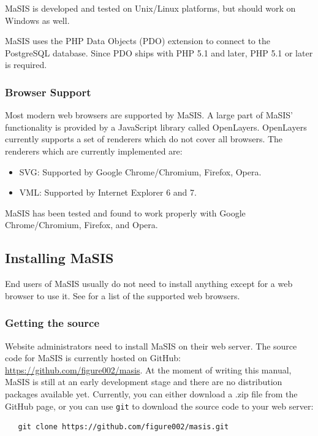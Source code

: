 \documentclass[twoside,a4paper]{refart}
\begin{document}
MaSIS is developed and tested on Unix/Linux platforms, but should work on Windows as well.

MaSIS uses the PHP Data Objects (PDO) extension to connect to the PostgreSQL database. Since PDO ships with PHP 5.1 and later, PHP 5.1 or later is required.

\subsubsection{Browser Support}
\label{Browser Support}

Most modern web browsers are supported by MaSIS. A large part of MaSIS' functionality is provided by a JavaScript library called OpenLayers. OpenLayers currently supports a set of renderers which do not cover all browsers. The renderers which are currently implemented are:

\begin{itemize}
    \item SVG: Supported by Google Chrome/Chromium, Firefox, Opera.
    \item VML: Supported by Internet Explorer 6 and 7.
\end{itemize}

MaSIS has been tested and found to work properly with Google Chrome/Chromium, Firefox, and Opera.

\subsection{Installing MaSIS}

End users of MaSIS usually do not need to install anything except for a web browser to use it. See  for a list of the supported web browsers.

\subsubsection{Getting the source}

Website administrators need to install MaSIS on their web server. The source code for MaSIS is currently hosted on GitHub: \url{https://github.com/figure002/masis}. At the moment of writing this manual, MaSIS is still at an early development stage and there are no distribution packages available yet. Currently, you can either download a .zip file from the GitHub page, or you can use \texttt{git} to download the source code to your web server:

\begin{verbatim}
   git clone https://github.com/figure002/masis.git
\end{verbatim}
\end{document}

